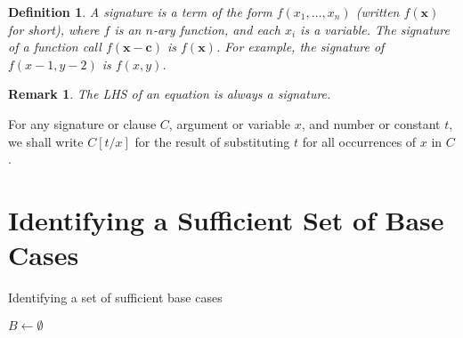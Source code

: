 \documentclass{article}
\newtheorem{definition}{Definition}
\newtheorem*{remark}{Remark}
\begin{document}
\begin{definition}
  A \emph{signature} is a term of the form $f(x_{1}, \dots, x_{n})$ (written
  $f(\mathbf{x})$ for short), where $f$ is an $n$-ary function, and each $x_{i}$
  is a variable. The signature of a function call $f(\mathbf{x} - \mathbf{c})$
  is $f(\mathbf{x})$. For example, the signature of $f(x - 1, y - 2)$ is
  $f(x, y)$.
\end{definition}

\begin{remark}
  The LHS of an equation is always a signature.
\end{remark}

For any signature or clause $C$, argument or variable $x$, and number or
constant $t$, we shall write $C[t / x]$ for the result of substituting $t$ for
all occurrences of $x$ in $C$.

\section{Identifying a Sufficient Set of Base Cases}

\begin{algorithm}[t]
  \caption{Identifying a set of sufficient base cases}\label{alg1}

  $B \gets \emptyset$\;
\end{algorithm}
\end{document}
